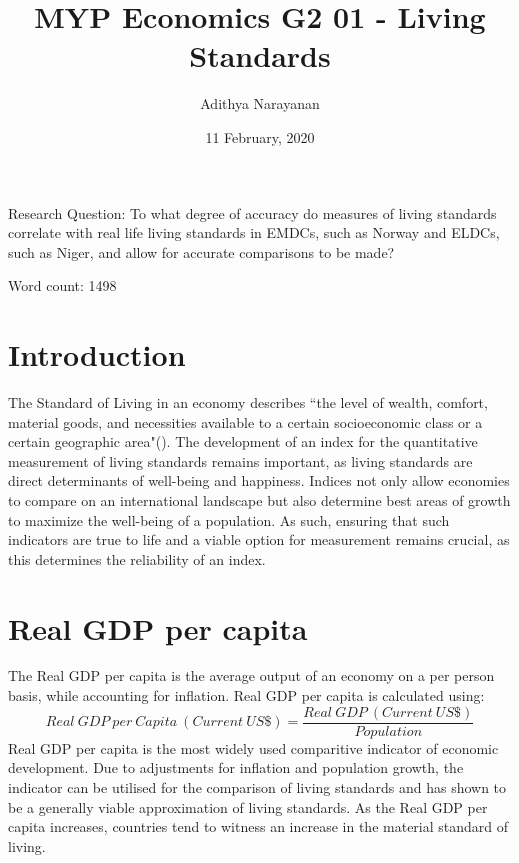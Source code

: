 \documentclass[11pt, a4paper]{article}
\title{MYP Economics G2 01 - Living Standards}
\author{Adithya Narayanan}
\date{11 February, 2020}
\begin{document}
	\begin{titlepage}
		\maketitle

		\begin{center}
			\large Research Question: To what degree of accuracy do measures of living standards correlate with real life living standards in EMDCs, such as Norway and ELDCs, such as Niger, and allow for accurate comparisons to be made?

			Word count: 1498
		\end{center}
	\end{titlepage}
	 
	\newpage
	\section{Introduction}
		\vspace*{-4mm}
		The Standard of Living in an economy describes ``the level of wealth, comfort, material goods, and necessities available to a certain socioeconomic class or a certain geographic area"(\citeauthor{investopediaStandardLiving2019}). The development of an index for the quantitative measurement of living standards remains important, as living standards are direct determinants of well-being and happiness. Indices not only allow economies to compare on an international landscape but also determine best areas of growth to maximize the well-being of a population. As such, ensuring that such indicators are true to life and a viable option for measurement remains crucial, as this determines the reliability of an index. 
		\vspace*{-6mm}
	\section{Real GDP per capita}
		\vspace*{-4mm}
		The Real GDP per capita is the average output of an economy on a per person basis, while accounting for inflation. Real GDP per capita is calculated using:
		\begin{equation}
			Real \ GDP \ per \ Capita \ (Current \ US\$) = \frac{Real \ GDP \ (Current \ US\$)}{Population}
		\end{equation}
		Real GDP per capita is the most widely used comparitive indicator of economic development. Due to adjustments for inflation and population growth, the indicator can be utilised for the comparison of living standards and has shown to be a generally viable approximation of living standards. As the Real GDP per capita increases, countries tend to witness an increase in the material standard of living.
		
\end{document}
